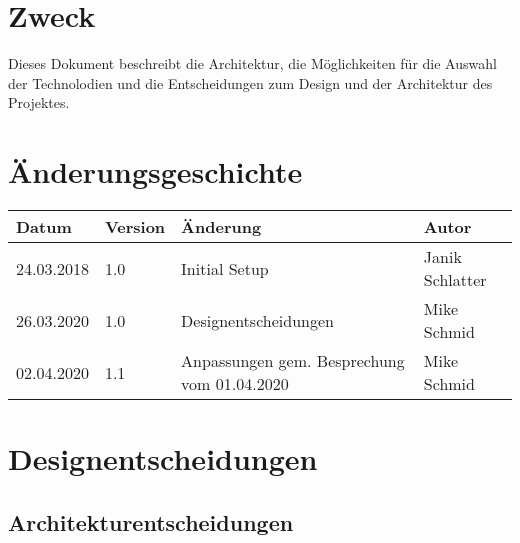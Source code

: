 \documentclass[
	ngerman,
	toc=listof, %
	toc=bibliography, %
	footnotes=multiple, %
	parskip=half, %
	numbers=noendperiod %
]{scrartcl}
\newcommand{\vorlagenOrdner}{../../99_Vorlagen} %
\begin{document}
\thispagestyle{plain}

\cleardoublepage


\section*{Zweck}
Dieses Dokument beschreibt die Architektur, die Möglichkeiten für die Auswahl der Technolodien und die Entscheidungen zum Design und der Architektur des Projektes.

\section*{Änderungsgeschichte}
\begin{tabularx}{\textwidth}{llXl}
	\toprule
	Datum & Version & Änderung & Autor \\
	\midrule
	24.03.2018 & 1.0 & Initial Setup & Janik Schlatter \\
	26.03.2020 & 1.0 & Designentscheidungen & Mike Schmid \\ 
	02.04.2020 & 1.1 & Anpassungen gem. Besprechung vom 01.04.2020 & Mike Schmid \\
	\bottomrule
\end{tabularx}
\cleardoublepage

{}
\tableofcontents
\cleardoublepage

\let\stdsection\section
\renewcommand\section{\clearpage\stdsection}

\section{Designentscheidungen}
	\subsection{Architekturentscheidungen}
\end{document}
